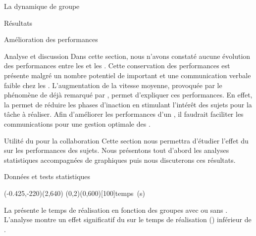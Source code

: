 \documentclass[myfrancais,ngerman,english,french]{mythesis}
\begin{document}
\begin{mychapter}{La dynamique de groupe}
\begin{mysection}{Résultats}
\begin{mysubsection}{Amélioration des performances}
\begin{mysubsubsection}{Analyse et discussion}
					Dans cette section, nous n'avons constaté aucune évolution des performances entre les  et les .
					Cette conservation des performances est présente malgré un nombre potentiel de  important et une communication verbale faible chez les .
					L'augmentation de la vitesse moyenne, provoquée par le phénomène de  déjà remarqué par , permet d'expliquer ces performances.
					En effet, la  permet de réduire les phases d'inaction en stimulant l'intérêt des sujets pour la tâche à réaliser.
					Afin d'améliorer les performances d'un , il faudrait faciliter les communications pour une gestion optimale des .
				\end{mysubsubsection}
			\end{mysubsection}
			\begin{mysubsection}{Utilité du \mybrainstorming pour la collaboration}
				Cette section nous permettra d'étudier l'effet du \mybrainstorming sur les performances des sujets.
				Nous présentons tout d'abord les analyses statistiques accompagnées de graphiques puis nous discuterons ces résultats.
				\begin{mysubsubsection}{Données et tests statistiques}
					\begin{myfigure}
						\begin{myps}(-0.425,-220)(2,640)
							\myaxes(0,2){\mybrainstorming}(0,600)[100]{temps~(s)}
						\end{myps}
					\end{myfigure}

					La  présente le temps de réalisation  en fonction des groupes avec ou sans \mybrainstorming {}.
					L'analyse montre un effet significatif du \mybrainstorming {} sur le temps de réalisation  () inférieur de .


\end{mysubsubsection}
\end{mysubsection}
\end{mysection}
\end{mychapter}
\end{document}
